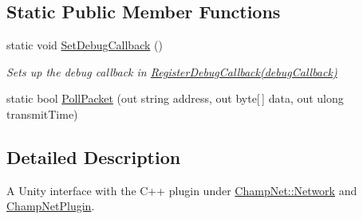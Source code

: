 \subsection*{Static Public Member Functions}
\begin{DoxyCompactItemize}
\item 
static void \hyperlink{class_champ_net_plugin_1_1_network_plugin_a21cad89e717d5dd351f73711ad5d6eb4}{Set\-Debug\-Callback} ()
\begin{DoxyCompactList}\small\item\em Sets up the debug callback in \hyperlink{class_champ_net_plugin_1_1_network_plugin_afbc9579060d47c7825a33ccd71c791ee}{Register\-Debug\-Callback(debug\-Callback)} \end{DoxyCompactList}\item 
static bool \hyperlink{class_champ_net_plugin_1_1_network_plugin_a779f2ef649d218531fc2232f1fd41b89}{Poll\-Packet} (out string address, out byte\mbox{[}$\,$\mbox{]} data, out ulong transmit\-Time)
\end{DoxyCompactItemize}


\subsection{Detailed Description}
A Unity interface with the C++ plugin under \hyperlink{class_champ_net_1_1_network}{Champ\-Net\-::\-Network} and \hyperlink{namespace_champ_net_plugin}{Champ\-Net\-Plugin}. 




